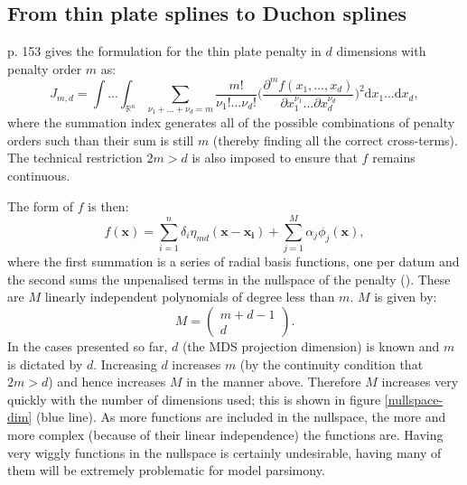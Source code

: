 \subsection{From thin plate splines to Duchon splines}
\label{gds-tprstoduchon}



\cite{simonbook} p. 153 gives the formulation for the thin plate penalty in $d$ dimensions with penalty order $m$ as:
\begin{equation}
J_{m,d} = \int \ldots \int_{\mathbb{R}^n} \sum_{\nu_1 + \dots + \nu_d=m} \frac{m!}{\nu_1! \dots \nu_d!}\Big( \frac{\partial^m f(x_1,\dots,x_d)}{\partial x_1^{\nu_1} \ldots  \partial x_d^{\nu_d}} \Big)^2 \text{d} x_1 \ldots  \text{d} x_d,
\label{tprs-pen}
\end{equation}
where the summation index generates all of the possible combinations of penalty orders such than their sum is still $m$ (thereby finding all the correct cross-terms). The technical restriction $2m>d$ is also imposed to ensure that $f$ remains continuous.

The form of $f$ is then:
\begin{equation}
f(\mathbf{x}) = \sum_{i=1}^n \delta_i \eta_{md}(\mathbf{x}-\mathbf{x_i}) + \sum_{j=1}^M \alpha_j \phi_j(\mathbf{x}),
\label{tprs-basis}
\end{equation}
where the first summation is a series of radial basis functions, one per datum and the second sums the unpenalised terms in the nullspace of the penalty (\cite{wood2003}). These are $M$ linearly independent polynomials of degree less than $m$. $M$ is given by:
\begin{equation*}
M=\begin{pmatrix} m+d-1 \\ d  \end{pmatrix}.
\end{equation*}
In the cases presented so far, $d$ (the MDS projection dimension) is known and $m$ is dictated by $d$. Increasing $d$ increases $m$ (by the continuity condition that $2m>d$) and hence increases $M$ in the manner above. Therefore $M$ increases very quickly with the number of dimensions used; this is shown in figure \ref{nullspace-dim} (blue line). As more functions are included in the nullspace, the more and more complex (because of their linear independence) the functions are. Having very wiggly functions in the nullspace is certainly undesirable, having many of them will be extremely problematic for model parsimony. 

